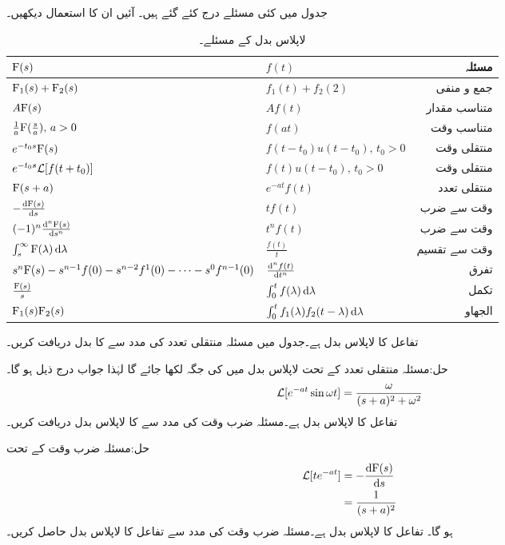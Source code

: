 جدول  میں کئی مسئلے درج کئے گئے ہیں۔ آئیں ان کا استعمال دیکھیں۔
\begin{table}
\caption{لاپلاس بدل کے مسئلے۔}
\label{جدول_لاپلاس_مسئلے}
\centering
\begin{tabular}{l l r}
 ${{\textup{F}}}(s)$&$f(t)$ & مسئلہ\\  [2ex] 
\hline
 ${{\textup{F}}}_1(s)+{{\textup{F}}}_2(s)$&$f_1(t)+f_2(2)$ & جمع و منفی\\[2ex] 
 $A{{\textup{F}}}(s)$&$Af(t)$& متناسب مقدار\\[2ex] 
$\frac{1}{a}{{\textup{F}}}(\frac{s}{a}),\, a>0$ & $ f(at)$ & متناسب وقت\\[2ex] 
 $e^{-t_0 s}{{\textup{F}}}(s)$&$f(t-t_0) u(t-t_0), \, t_0>0$  & منتقلی وقت\\[2ex] 
 $e^{-t_0 s}\mathcal{L} [f(t+t_0)]$&$f(t) u(t-t_0), \, t_0>0$  & منتقلی وقت\\[2ex] 
${{\textup{F}}}(s+a)$& $e^{-at} f(t)$  & منتقلی تعدد\\[2ex] 
$-\frac{\dif \bF(s)}{\dif s}$ & $t f(t)$  & وقت سے ضرب\\[2ex] 
$(-1)^n\frac{\dif{^n} \bF(s)}{\dif s^n}$ & $t^n f(t)$  & وقت سے ضرب\\[2ex] 
$\int_s^{\infty} \bF(\lambda) \dif \lambda $ & $\frac{f(t)}{t}$  & وقت سے تقسیم\\[2ex] 
$s^n {{\textup{F}}}(s)-s^{n-1}f(0)-s^{n-2} f^1(0)-\cdots -s^0 f^{n-1}(0)$ & $\frac{\dif{^n} f(t)}{\dif t^n}$  & تفرق\\[2ex] 
$\frac{{{\textup{F}}}(s)}{s}$ & $\int_0^t f(\lambda) \dif \lambda$  & تکمل\\[2ex] 
${{\textup{F}}}_1(s) {{\textup{F}}}_2(s)$ & $\int_0^t f_1(\lambda) f_2(t-\lambda) \dif \lambda$  & الجھاو
\end{tabular}
\end{table}
تفاعل  کا لاپلاس بدل  ہے۔جدول  میں مسئلہ منتقلی تعدد کی مدد سے  کا بدل دریافت کریں۔

حل:مسئلہ منتقلی تعدد کے تحت لاپلاس بدل میں  کی جگہ   لکھا جائے گا لہٰذا جواب درج ذیل ہو گا۔
\begin{align*}
\mathcal{L}[e^{-at} \sin \omega t]=\frac{\omega}{(s+a)^2+\omega^2}
\end{align*}
تفاعل  کا لاپلاس بدل  ہے۔مسئلہ ضرب وقت کی مدد سے  کا لاپلاس بدل دریافت کریں۔

حل:مسئلہ ضرب وقت کے  تحت
\begin{align*}
\Laplace[te^{-at}] &=-\frac{\dif \bF(s)}{\dif s}\\
&=\frac{1}{(s+a)^2}
\end{align*}
ہو گا۔
تفاعل  کا لاپلاس بدل  ہے۔مسئلہ ضرب وقت کی مدد سے تفاعل  کا  لاپلاس بدل حاصل کریں۔

